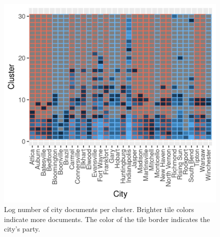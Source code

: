 \documentclass[11pt]{article}
\begin{document}
\begin{figure}[!ht]
	\centering
	\caption{Log number of city documents per cluster. Brighter tile colors indicate more documents. The color of the tile border indicates the city's party.}
	\label{hclustCity30}
	\includegraphics[width=\linewidth]{figures/heatmap_hclust_30.png}
\end{figure}
\end{document}
